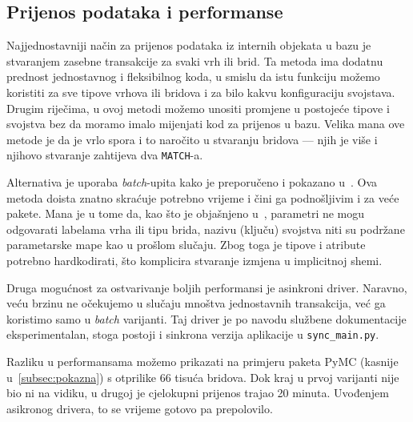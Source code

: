 \subsection{Prijenos podataka i performanse} \label{subsec:performanse}
Najjednostavniji način za prijenos podataka iz internih
objekata u bazu je stvaranjem zasebne transakcije za svaki vrh
ili brid. Ta metoda ima dodatnu prednost jednostavnog i 
fleksibilnog koda, u smislu da istu funkciju možemo koristiti
za sve tipove vrhova ili bridova i za bilo kakvu konfiguraciju svojstava.
Drugim riječima, u ovoj metodi možemo unositi promjene
u postojeće tipove i svojstva bez da moramo imalo mijenjati kod
za prijenos u bazu. Velika mana ove metode je da je vrlo spora i to
naročito u stvaranju bridova --- njih je više i njihovo stvaranje
zahtijeva dva \texttt{MATCH}-a.

Alternativa je uporaba \emph{batch}-upita kako je preporučeno
i pokazano u~\cite{neo4j:performance}. Ova metoda doista znatno
skraćuje potrebno vrijeme i čini ga podnošljivim i za veće pakete.
Mana je u tome da, kao što je objašnjeno u~\cite{neo4j:params},
parametri ne mogu odgovarati labelama vrha ili tipu brida, nazivu
(ključu) svojstva niti su podržane parametarske mape kao u
prošlom slučaju. Zbog toga je tipove i atribute potrebno
hardkodirati, što komplicira stvaranje izmjena
u implicitnoj shemi.

Druga mogućnost za ostvarivanje boljih performansi je asinkroni driver.
Naravno, veću brzinu ne očekujemo u slučaju mnoštva jednostavnih
transakcija, već ga koristimo samo u \emph{batch} varijanti. Taj driver
je po navodu službene dokumentacije eksperimentalan, stoga postoji
i sinkrona verzija aplikacije u \texttt{sync_\-main.py}.

Razliku u performansama možemo prikazati na primjeru paketa
PyMC (kasnije u~\ref{subsec:pokazna}) s otprilike 66 tisuća bridova.
Dok kraj u prvoj varijanti nije bio ni na vidiku,
u drugoj je cjelokupni prijenos trajao 20 minuta.
Uvođenjem asikronog drivera, to se vrijeme gotovo pa prepolovilo.
\newpage
